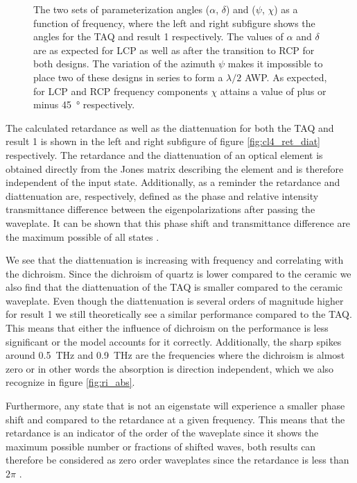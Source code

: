 \begin{figure}[ht]
    \centering
    
    \caption{The two sets of parameterization angles ($\alpha$, $\delta$) and ($\psi$, $\chi$) as a function of frequency, where the left and right subfigure shows the angles for the TAQ and result 1 respectively. The values of $\alpha$ and $\delta$ are as expected for LCP as well as after the transition to RCP for both designs. The variation of the azimuth $\psi$ makes it impossible to place two of these designs in series to form a $\lambda/2$ AWP. As expected, for LCP and RCP frequency components $\chi$ attains a value of plus or minus \SI{45}{\degree} respectively.}
    \label{fig:cl4_params}
\end{figure}

The calculated retardance as well as the diattenuation for both the TAQ and result 1 is shown in the left and right subfigure of figure \ref{fig:cl4_ret_diat} respectively. The retardance and the diattenuation of an optical element is obtained directly from the Jones matrix describing the element and is therefore independent of the input state. Additionally, as a reminder the retardance and diattenuation are, respectively, defined as the phase and relative intensity transmittance difference between the eigenpolarizations after passing the waveplate. It can be shown that this phase shift and transmittance difference are the maximum possible of all states \cite{Lu1994}. 

We see that the diattenuation is increasing with frequency and correlating with the dichroism. Since the dichroism of quartz is lower compared to the  ceramic we also find that the diattenuation of the TAQ is smaller compared to the ceramic waveplate. Even though the diattenuation is several orders of magnitude higher for result 1 we still theoretically see a similar performance compared to the TAQ. This means that either the influence of dichroism on the performance is less significant or the model accounts for it correctly. Additionally, the sharp spikes around \SI{0.5}{\tera \hertz} and \SI{0.9}{\tera \hertz} are the frequencies where the dichroism is almost zero or in other words the absorption is direction independent, which we also recognize in figure \ref{fig:ri_abs}. 

Furthermore, any state that is not an eigenstate will experience a smaller phase shift and compared to the retardance at a given frequency. This means that the retardance is an indicator of the order of the waveplate since it shows the maximum possible number or fractions of shifted waves, both results can therefore be considered as zero order waveplates since the retardance is less than $2\pi$ \cite{Samoylov2004}. 

